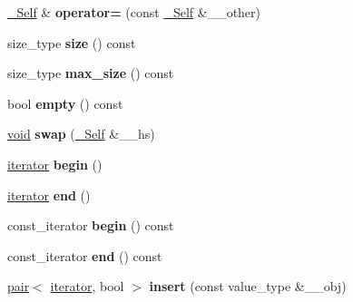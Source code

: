 \begin{DoxyCompactItemize}
\item 
\mbox{\label{classunordered__set_a46c53a0eeab66bccbb029365e494b816}} 
\hyperlink{classunordered__set}{\+\_\+\+Self} \& {\bfseries operator=} (const \hyperlink{classunordered__set}{\+\_\+\+Self} \&\+\_\+\+\_\+other)
\item 
\mbox{\label{classunordered__set_a909d0958f7f81835c8425af944b0735d}} 
size\+\_\+type {\bfseries size} () const
\item 
\mbox{\label{classunordered__set_a64d7df813020c3f5d02337e9f2d465ee}} 
size\+\_\+type {\bfseries max\+\_\+size} () const
\item 
\mbox{\label{classunordered__set_a607e5760c8198a451be2193daa7726e1}} 
bool {\bfseries empty} () const
\item 
\mbox{\label{classunordered__set_ad04f0511de1eadee9d08d5650f55da54}} 
\hyperlink{interfacevoid}{void} {\bfseries swap} (\hyperlink{classunordered__set}{\+\_\+\+Self} \&\+\_\+\+\_\+hs)
\item 
\mbox{\label{classunordered__set_ab8f1d2480f56ac3cf56e1b5e011a778c}} 
\hyperlink{structiterator}{iterator} {\bfseries begin} ()
\item 
\mbox{\label{classunordered__set_ad4f8c4511d3de30d3c2aa882409ab676}} 
\hyperlink{structiterator}{iterator} {\bfseries end} ()
\item 
\mbox{\label{classunordered__set_a7ff0de2d4e21d410248995960b90e4ff}} 
const\+\_\+iterator {\bfseries begin} () const
\item 
\mbox{\label{classunordered__set_a4aa69568b02ee0d42a367feaae8873dd}} 
const\+\_\+iterator {\bfseries end} () const
\item 
\mbox{\label{classunordered__set_a9d9e4895663bde0b2096f79a3dc24cb9}} 
\hyperlink{structpair}{pair}$<$ \hyperlink{structiterator}{iterator}, bool $>$ {\bfseries insert} (const value\+\_\+type \&\+\_\+\+\_\+obj)
\item 

\end{DoxyCompactItemize}
